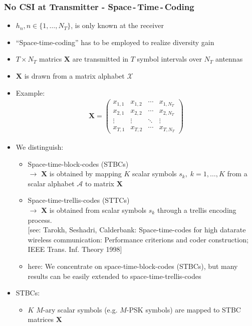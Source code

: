 \documentclass[a4paper, 10pt]{article}
\begin{document}
\subsubsection{No CSI at Transmitter - Space\,-\,Time\,-\,Coding}
\begin{itemize}
	\item $h_n, n\in\{1,\dots ,N_T\}$, is only known at the receiver
	\item ``Space-time-coding'' has to be employed to realize diversity gain
	\item $T\times N_T$ matrics $\mathbf{X}$ are transmitted in $T$ symbol intervals over $N_T$ antennas
	\item $\mathbf{X}$ is drawn from a matrix alphabet $\mathcal{X}$
	\item Example:
	\begin{align*}
		\mathbf{X}=\begin{pmatrix} x_{1,1} & x_{1,2} & \cdots & x_{1,N_T} \\
					   x_{2,1} & x_{2,2} & \cdots & x_{2,N_T} \\
					   \vdots  & \vdots  & \ddots & \vdots    \\
				 	   x_{T,1} & x_{T,2} & \cdots & x_{T,N_T}
			\end{pmatrix}
	\end{align*}
	\item We distinguish:
		\begin{itemize}
			\item Space-time-block-codes (STBCs)\\
			$\rightarrow$ $\mathbf{X}$ is obtained by mapping $K$ scalar symbols $s_k,\; k=1, \dots , K$ from a scalar alphabet $\mathcal{A}$ to matrix $\mathbf{X}$
			\item Space-time-trellis-codes (STTCs)\\
			$\rightarrow$ $\mathbf{X}$ is obtained from scalar symbols $s_k$ through a trellis encoding process.\\
			{\small[see: Tarokh, Seshadri, Calderbank: Space-time-codes for high datarate wireless communication: Performance criterions and coder construction; IEEE Trans. Inf. Theory 1998]}
			\item here: We concentrate on space-time-block-codes (STBCs), but many results can be easily extended to space-time-trellis-codes
		\end{itemize}
	\item STBCs:
		\begin{itemize}
			\item  $K$ $M$-ary scalar symbols (e.g. $M$-PSK symbols) are mapped to STBC matrices $\mathbf{X}$\\ 

\end{itemize}
\end{itemize}
\end{document}

